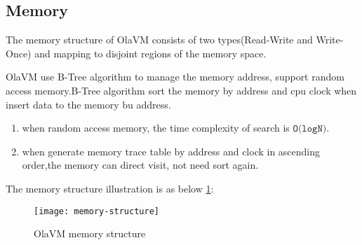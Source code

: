 \subsection{Memory}\label{subsec: ola-memory}
The memory structure of OlaVM consists of two types(Read-Write and Write-Once) and mapping to disjoint regions of the memory space.
\begin{table}[!ht]
    \caption{Memory segment range}
    \label{table:memory-segment-range}
\end{table}


OlaVM use B-Tree algorithm to manage the memory address, support random access memory.B-Tree algorithm sort the memory by address and cpu clock when insert data to the memory bu address.
\begin{enumerate}
    \item when random access memory, the time complexity of search is $\texttt{O(logN)}$.
    \item when generate memory trace table by address and clock in ascending order,the memory can direct visit, not need sort again.
\end{enumerate}

The memory structure illustration is as below \ref{fig: B-tree-memory}:
\begin{figure}[!htp]
    \centering
    \texttt{[image: memory-structure]}
    \caption{OlaVM memory structure}
    \label{fig: B-tree-memory}
\end{figure}